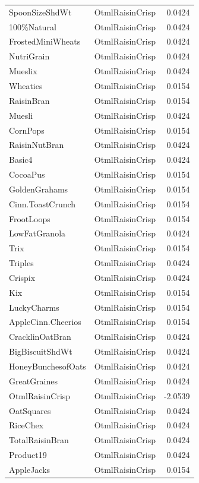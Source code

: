 \begin{longtable}{llr}
SpoonSizeShdWt & OtmlRaisinCrisp & 0.0424 \\
100\%Natural & OtmlRaisinCrisp & 0.0424 \\
FrostedMiniWheats & OtmlRaisinCrisp & 0.0424 \\
NutriGrain & OtmlRaisinCrisp & 0.0424 \\
Mueslix & OtmlRaisinCrisp & 0.0424 \\
Wheaties & OtmlRaisinCrisp & 0.0154 \\
RaisinBran & OtmlRaisinCrisp & 0.0154 \\
Muesli & OtmlRaisinCrisp & 0.0424 \\
CornPops & OtmlRaisinCrisp & 0.0154 \\
RaisinNutBran & OtmlRaisinCrisp & 0.0424 \\
Basic4 & OtmlRaisinCrisp & 0.0424 \\
CocoaPus & OtmlRaisinCrisp & 0.0154 \\
GoldenGrahams & OtmlRaisinCrisp & 0.0154 \\
Cinn.ToastCrunch & OtmlRaisinCrisp & 0.0154 \\
FrootLoops & OtmlRaisinCrisp & 0.0154 \\
LowFatGranola & OtmlRaisinCrisp & 0.0424 \\
Trix & OtmlRaisinCrisp & 0.0154 \\
Triples & OtmlRaisinCrisp & 0.0424 \\
Crispix & OtmlRaisinCrisp & 0.0424 \\
Kix & OtmlRaisinCrisp & 0.0154 \\
LuckyCharms & OtmlRaisinCrisp & 0.0154 \\
AppleCinn.Cheerios & OtmlRaisinCrisp & 0.0154 \\
CracklinOatBran & OtmlRaisinCrisp & 0.0424 \\
BigBiscuitShdWt & OtmlRaisinCrisp & 0.0424 \\
HoneyBunchesofOats & OtmlRaisinCrisp & 0.0424 \\
GreatGraines & OtmlRaisinCrisp & 0.0424 \\
OtmlRaisinCrisp & OtmlRaisinCrisp & -2.0539 \\
OatSquares & OtmlRaisinCrisp & 0.0424 \\
RiceChex & OtmlRaisinCrisp & 0.0424 \\
TotalRaisinBran & OtmlRaisinCrisp & 0.0424 \\
Product19 & OtmlRaisinCrisp & 0.0424 \\
AppleJacks & OtmlRaisinCrisp & 0.0154 \\

\end{longtable}
